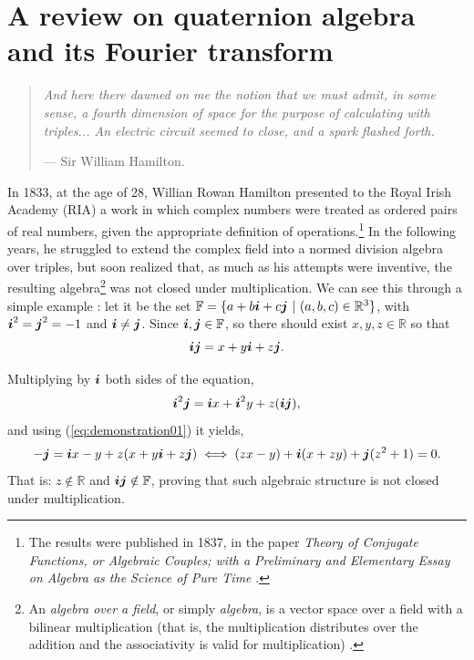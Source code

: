 \chapter{A review on quaternion algebra and its Fourier transform}
\label{ch:reviewQuat}

\begin{quotation}
    \itshape
    And here there dawned on me the notion that we must admit, in some sense, a fourth dimension of space for the purpose of calculating with triples... An electric circuit seemed to close, and a spark flashed forth.

    \noindent --- Sir William Hamilton.
\end{quotation}


In 1833, at the age of 28, Willian Rowan Hamilton presented to the Royal Irish Academy (RIA) a work in which complex numbers were treated as ordered pairs of real numbers, given the appropriate definition of operations.\footnote{The results were published in 1837, in the paper \emph{Theory of Conjugate Functions, or Algebraic Couples; with a Preliminary and Elementary Essay on Algebra as the Science of Pure Time} \cite{hamilton1837theory}.} In the following years, he struggled to extend the complex field into a normed division algebra over triples, but soon realized that, as much as his attempts were inventive, the resulting algebra\footnote{An \textit{algebra over a field}, or simply \textit{algebra}, is a vector space over a field with a bilinear multiplication (that is, the multiplication distributes over the addition and the associativity is valid for multiplication) \cite{schafer1955introduction}.} was not closed under multiplication. We can see this through a simple example \cite{santos2011algebra}: let it be the set $\mathbb{F} = \{ a + b \boldsymbol{i} + c \boldsymbol{j}  \ | \ (a, b, c) \in \mathbb{R}^3\}$, with $\boldsymbol{i}^2 = \boldsymbol{j}^2 = -1$ and $\boldsymbol{i} \neq \boldsymbol{j}$. Since $\boldsymbol{i}, \boldsymbol{j} \in \mathbb{F}$, so there should exist $x, y, z \in \mathbb{R}$ so that
\begin{equation}
    \boldsymbol{i} \boldsymbol{j} = x + y \boldsymbol{i} + z \boldsymbol{j}.
    \label{eq:demonstration01}
\end{equation}

Multiplying by $\boldsymbol{i}$ both sides of the equation,
\begin{equation}
    \boldsymbol{i}^2 \boldsymbol{j} = \boldsymbol{i} x + \boldsymbol{i}^2 y + z (\boldsymbol{i} \boldsymbol{j}),
\end{equation}
and using (\ref{eq:demonstration01}) it yields,
\begin{equation}
    - \boldsymbol{j} = \boldsymbol{i} x - y + z (x + y \boldsymbol{i} + z \boldsymbol{j})
    \iff
    (zx - y) + \boldsymbol{i} (x + zy) + \boldsymbol{j} (z^2 + 1) = 0.
\end{equation}
That is: $z \notin \mathbb{R}$ and $ \boldsymbol{i} \boldsymbol{j} \notin \mathbb{F} $, proving that such algebraic structure is not closed under multiplication.

